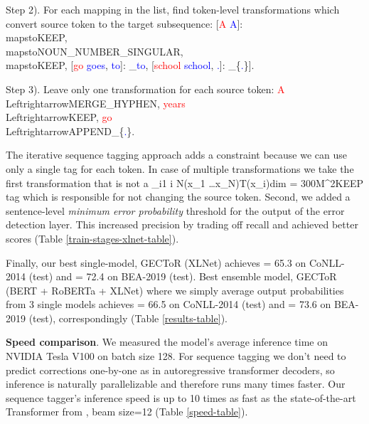 \documentclass[11pt,a4paper]{article}
\begin{document}
Step 2). For each mapping in the list, find token-level transformations which convert source token to the target subsequence: [\textcolor{red}{A}  \textcolor{blue}{A}]: \\mapstoKEEP, \\mapstoNOUN\_NUMBER\_SINGULAR, \\mapstoKEEP, [\textcolor{red}{go}  \textcolor{blue}{goes}, \textcolor{blue}{to}]: \APPEND\_\textcolor{blue}{to}, [\textcolor{red}{school}  \textcolor{blue}{school}, \textcolor{blue}{.}]: \APPEND\_\{\textcolor{blue}{.}\}].

Step 3). Leave only one transformation for each source token:
\textcolor{red}{A}  \\LeftrightarrowMERGE\_HYPHEN,
\textcolor{red}{years}  \\LeftrightarrowKEEP,
\textcolor{red}{go}  \\LeftrightarrowAPPEND\_\{\textcolor{blue}{.}\}. 

The iterative sequence tagging approach adds a constraint because we can use only a single tag for each token. In case of multiple transformations we take the first transformation that is not a \x_i1 \leq i \leq N(x_1 \ldots x_N)T(x_i)dim = 300M^2KEEP tag which is responsible for not changing the source token. 
Second, we added a sentence-level \textit{minimum error probability} threshold for the output of the error detection layer. This increased precision by trading off recall and achieved better  scores (Table \ref{train-stages-xlnet-table}). 

Finally, our best single-model, GECToR (XLNet) achieves  = 65.3 on CoNLL-2014 (test) and  = 72.4 on BEA-2019 (test). Best ensemble model, GECToR (BERT + RoBERTa + XLNet) where we simply average output probabilities from 3 single models achieves  = 66.5 on CoNLL-2014 (test) and  = 73.6 on BEA-2019 (test), correspondingly (Table \ref{results-table}).


\textbf{Speed comparison}. We measured the model’s average inference time on NVIDIA Tesla V100 on batch size 128. For sequence tagging we don't need to predict corrections one-by-one as in autoregressive transformer decoders, so inference is naturally parallelizable and therefore runs many times faster. Our sequence tagger's inference speed is up to 10 times as fast as the state-of-the-art Transformer from \citet{zhao2019improving}, beam size=12 (Table \ref{speed-table}).
\end{document}
